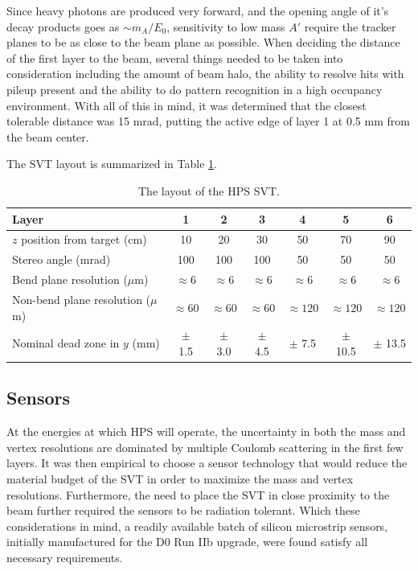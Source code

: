 Since heavy photons are produced very forward, and the opening angle of it's 
decay products goes as $\sim m_{A}/E_{0}$, sensitivity to low mass $A'$ require
the tracker planes to be as close to the beam plane as possible.  When deciding
the distance of the first layer to the beam, several things  needed to be taken
into consideration including the amount of beam halo, the ability to resolve 
hits with pileup present and the ability to do pattern recognition in a high 
occupancy environment.  With all of this in mind, it was determined that the 
closest tolerable distance was 15 mrad, putting the active edge of layer 1 
at 0.5 mm from the beam center.  

The SVT layout is summarized in Table \ref{tab:svt_layout}.

\begin{table}[t]
 \begin{center}
\begin{tabular}{l|cccccc}  
\hline
Layer & 1 & 2 & 3 & 4 & 5 & 6 \\ \hline
$z$ position from target (cm)    & 10 & 20 & 30 & 50 & 70 & 90 \\
Stereo angle (mrad) & 100 & 100 & 100 & 50 & 50 & 50 \\
Bend plane resolution ($\mu$m) & $\approx$6 & $\approx$6 & $\approx$6 & $\approx$6 & $\approx$6 & $\approx$6 \\
Non-bend plane resolution ($\mu$m) & $\approx60$ & $\approx60$ & $\approx60$ & $\approx120$ & $\approx120$ & $\approx120$ \\
Nominal dead zone in $y$ (mm) & $\pm$ 1.5 & $\pm$ 3.0 & $\pm$ 4.5 & $\pm$ 7.5 & $\pm$ 10.5 & $\pm$ 13.5 \\ 
\hline
\end{tabular}
\caption{The layout of the HPS SVT.}
\label{tab:svt_layout}
\end{center}
\end{table}

\subsection{Sensors}

At the energies at which HPS will operate, the uncertainty in both the mass and
vertex resolutions are dominated by multiple Coulomb scattering in the first 
few layers.  It was then empirical to choose a sensor technology that would 
reduce the material budget of the SVT in order to maximize the mass and vertex
resolutions.  Furthermore, the need to place the SVT in close proximity to the 
beam further required the sensors to be radiation tolerant.  Which these 
considerations in mind, a readily available batch of silicon microstrip sensors,
initially manufactured for the D0 Run IIb upgrade, were found satisfy all 
necessary requirements.

